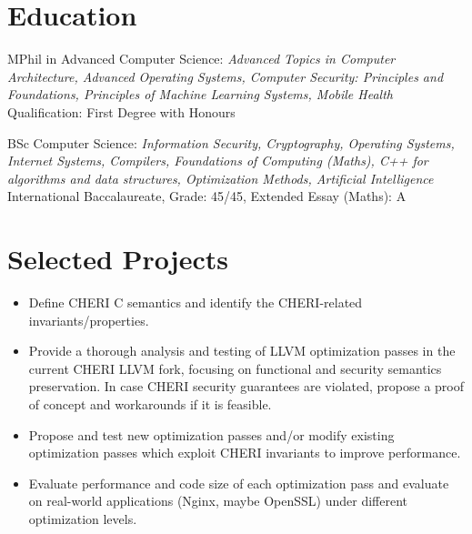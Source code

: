 \documentclass{resume}
\begin{document}



\section{Education}
MPhil in Advanced Computer Science: \textit{Advanced Topics in Computer Architecture, Advanced Operating Systems, Computer Security: Principles and Foundations, Principles of Machine Learning Systems, Mobile Health}
Qualification: First Degree with Honours

BSc Computer Science: \textit{Information Security, Cryptography, Operating Systems, Internet Systems, Compilers, Foundations of Computing (Maths),
C++ for algorithms and data structures, Optimization Methods, Artificial Intelligence}
International Baccalaureate, Grade: 45/45, Extended Essay (Maths): A


\section{Selected Projects}

\begin{itemize}
  \item Define CHERI C semantics and identify the CHERI-related invariants/properties.
  \item Provide a thorough analysis and testing of LLVM optimization passes in the current CHERI LLVM fork, focusing on functional and security semantics preservation. In case CHERI security guarantees are violated, propose a proof of concept and workarounds if it is feasible. 
  \item Propose and test new optimization passes and/or modify existing optimization passes which exploit CHERI invariants to improve performance. 
  \item Evaluate performance and code size of each optimization pass and evaluate on real-world applications (Nginx, maybe OpenSSL) under different optimization levels. 
\end{itemize}
\end{document}

